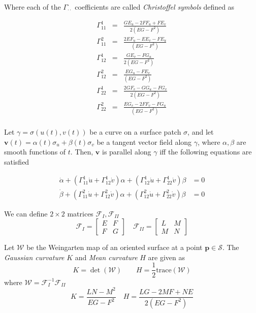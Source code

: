 \documentclass[12pt]{article}
\begin{document}
\begin{multicols*}{2}
Where each of the $\Gamma_{\cdot\cdot}^{\cdot}$ coefficients are called \textit{Christoffel symbols} defined as 

\[\begin{aligned}
    \Gamma_{11}^1 &=& \frac{GE_u - 2FF_u + FE_v}{2(EG - F^2)} \\ \Gamma_{11}^2 &=& \frac{2EF_u - E E_v -FE_u}{(EG - F^2)}\\
    \Gamma_{12}^1 &=& \frac{GE_v - FG_u}{2(EG - F^2)} \\ \Gamma_{12}^2 &=& \frac{EG_u - FE_v}{(EG - F^2)}\\
    \Gamma_{22}^1 &=& \frac{2GF_v-GG_u-FG_v}{2(EG - F^2)} \\ \Gamma_{22}^2 &=& \frac{EG_v-2FF_v-FG_u}{(EG - F^2)}\\
\end{aligned}\]

Let $\gamma = \sigma(u(t), v(t))$ be a curve on a surface patch $\sigma$, and let $\mathbf{v}(t) = \alpha(t)\sigma_u + \beta(t)\sigma_v$ be a tangent vector field along $\gamma$, where $\alpha, \beta$ are smooth functions of $t$. Then, $\mathbf{v}$ is parallel along $\gamma$ iff the following equations are satisfied

\[\begin{aligned}
\dot{\alpha} + (\Gamma_{11}^1\dot{u} + \Gamma_{12}^1\dot{v})\alpha + (\Gamma_{12}^1\dot{u} + \Gamma_{22}^1\dot{v})\beta&=0 \\
\dot{\beta} + (\Gamma_{11}^2\dot{u} + \Gamma_{12}^2\dot{v})\alpha + (\Gamma_{12}^2\dot{u} + \Gamma_{22}^2\dot{v})\beta&= 0
\end{aligned}\]

We can define $2\times2$ matrices $\mathcal{F}_{I}, \mathcal{F}_{II}$ \[\mathcal{F}_{I} = \left[\begin{array}{cc} E & F \\ F & G \end{array}\right]\quad \mathcal{F}_{II} = \left[\begin{array}{cc} L & M \\ M & N \end{array}\right]\]

Let $\mathcal{W}$ be the Weingarten map of an oriented surface at a point $\mathbf{p} \in \mathcal{S}$. The \textit{Gaussian curvature} $K$ and \textit{Mean curvature} $H$ are given as \[K = \det (\mathcal{W})\qquad H = \frac{1}{2}\text{trace}(\mathcal{W})\] where $\mathcal{W} = \mathcal{F}_{I}^{-1}\mathcal{F}_{II}$\[K = \frac{LN-M^2}{EG-F^2}\quad H = \frac{LG-2MF+NE}{2(EG-F^2)}\]


\end{multicols*}
\end{document}

